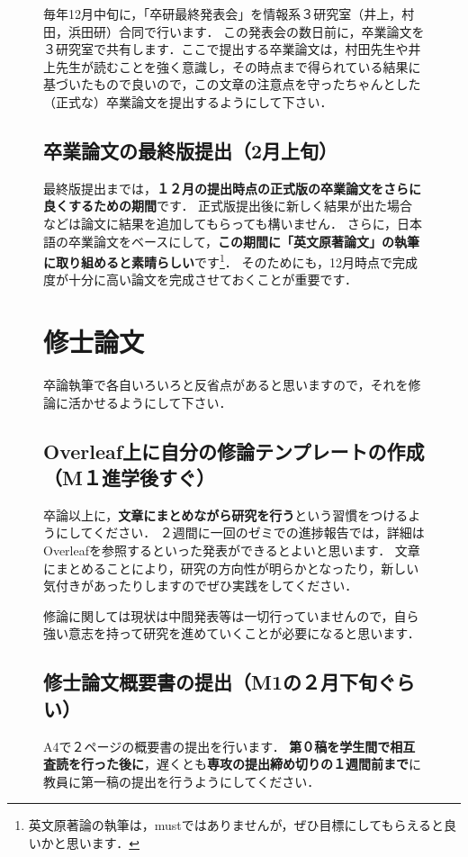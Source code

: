 \documentclass[dvipdfmx,autodetect-engine]{jsreport}
\begin{document}
\begin{figure}[h]
{毎年12月中旬に，「卒研最終発表会」を情報系３研究室（井上，村田，浜田研）合同で行います．
この発表会の数日前に，卒業論文を３研究室で共有します．ここで提出する卒業論文は，村田先生や井上先生が読むことを強く意識し，その時点まで得られている結果に基づいたもので良いので，この文章の注意点を守ったちゃんとした（正式な）卒業論文を提出するようにして下さい．

\subsection{卒業論文の最終版提出（2月上旬）}

最終版提出までは，\textbf{１２月の提出時点の正式版の卒業論文をさらに良くするための期間}です．
正式版提出後に新しく結果が出た場合などは論文に結果を追加してもらっても構いません．
さらに，日本語の卒業論文をベースにして，\textbf{この期間に「英文原著論文」の執筆に取り組めると素晴らしい}です\footnote{英文原著論の執筆は，mustではありませんが，ぜひ目標にしてもらえると良いかと思います．}．
そのためにも，12月時点で完成度が十分に高い論文を完成させておくことが重要です．

\section{修士論文}

卒論執筆で各自いろいろと反省点があると思いますので，それを修論に活かせるようにして下さい．

\subsection{Overleaf上に自分の修論テンプレートの作成（M１進学後すぐ）}

卒論以上に，\textbf{文章にまとめながら研究を行う}という習慣をつけるようにしてください．
２週間に一回のゼミでの進捗報告では，詳細はOverleafを参照するといった発表ができるとよいと思います．
文章にまとめることにより，研究の方向性が明らかとなったり，新しい気付きがあったりしますのでぜひ実践をしてください．

修論に関しては現状は中間発表等は一切行っていませんので，自ら強い意志を持って研究を進めていくことが必要になると思います．


\subsection{修士論文概要書の提出（M1の２月下旬ぐらい）}

A4で２ページの概要書の提出を行います．
\textbf{第０稿を学生間で相互査読を行った後に}，遅くとも\textbf{専攻の提出締め切りの１週間前まで}に教員に第一稿の提出を行うようにしてください．

}
\end{figure}
\end{document}
